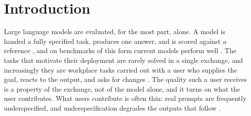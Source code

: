 %

\section{Introduction}

Large language models are evaluated, for the most part, alone. A model is handed a fully
specified task, produces one answer, and is scored against a reference
\cite{mizrahi2024state, sclar2024quantifying}, and on benchmarks of this form current
models perform well \cite{liang2023holistic}. The tasks
that motivate their deployment are rarely solved in a single exchange, and increasingly they are workplace tasks carried out with a user who supplies the goal, reacts to the output,
and asks for changes \cite{anthropic2025economicindex, laban2025lost}. The quality such a
user receives is a property of the exchange, not of the model alone, and it turns on what
the user contributes. What users contribute is often thin: real prompts are
frequently underspecified, and underspecification degrades the outputs that follow
\cite{yang2025underspecification}.

